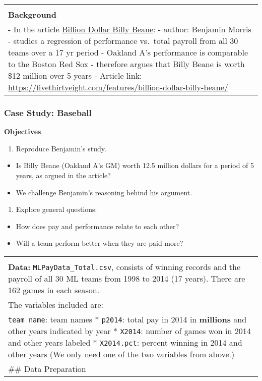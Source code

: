 \documentclass[
]{article}
\providecommand{\tightlist}{%
  \setlength{\itemsep}{0pt}\setlength{\parskip}{0pt}}
\begin{document}
\begin{longtable}[]{@{}
  >{\raggedright\arraybackslash}p{}@{}}
\toprule
\endhead
 \\
\textbf{Background} \\
- In the article
\href{https://fivethirtyeight.com/features/billion-dollar-billy-beane/}{Billion
Dollar Billy Beane}: - author: Benjamin Morris - studies a regression of
performance vs.~total payroll from all 30 teams over a 17 yr period -
Oakland A's performance is comparable to the Boston Red Sox - therefore
argues that Billy Beane is worth \$12 million over 5 years - Article
link:
\url{https://fivethirtyeight.com/features/billion-dollar-billy-beane/} \\
\bottomrule
\end{longtable}

\frametitle{Case Study: Baseball}

\textbf{Objectives}

\begin{enumerate}
\def\labelenumi{\arabic{enumi}.}
\tightlist
\item
  Reproduce Benjamin's study.
\end{enumerate}

\begin{itemize}
\tightlist
\item
  Is Billy Beane (Oakland A's GM) worth 12.5 million dollars for a
  period of 5 years, as argued in the article?
\item
  We challenge Benjamin's reasoning behind his argument.
\end{itemize}

\begin{enumerate}
\def\labelenumi{\arabic{enumi}.}
\setcounter{enumi}{1}
\tightlist
\item
  Explore general questions:
\end{enumerate}

\begin{itemize}
\tightlist
\item
  How does pay and performance relate to each other?
\item
  Will a team perform better when they are paid more?
\end{itemize}

\begin{longtable}[]{@{}
  >{\raggedright\arraybackslash}p{}@{}}
\toprule
\endhead
 \\
\textbf{Data:} \texttt{MLPayData\_Total.csv}, consists of winning
records and the payroll of all 30 ML teams from 1998 to 2014 (17 years).
There are 162 games in each season. \\
The variables included are: \\
* \texttt{team\ name}: team names * \texttt{p2014}: total pay in 2014 in
\textbf{millions} and other years indicated by year * \texttt{X2014}:
number of games won in 2014 and other years labeled *
\texttt{X2014.pct}: percent winning in 2014 and other years (We only
need one of the two variables from above.) \\
\#\# Data Preparation \\
\bottomrule
\end{longtable}
\end{document}
